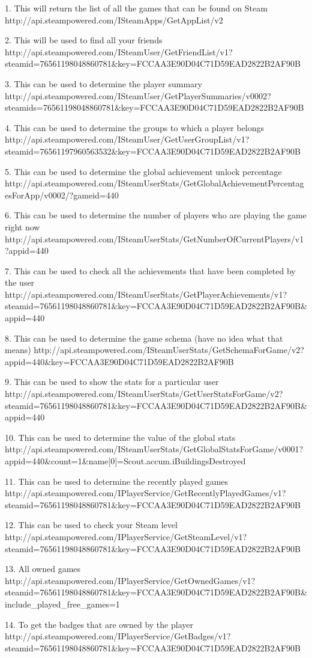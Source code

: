 1. This will return the list of all the games that can be found on Steam
http://api.steampowered.com/ISteamApps/GetAppList/v2

2. This will be used to find all your friends
http://api.steampowered.com/ISteamUser/GetFriendList/v1?steamid=76561198048860781&key=FCCAA3E90D04C71D59EAD2822B2AF90B

3. This can be used to determine the player summary
http://api.steampowered.com/ISteamUser/GetPlayerSummaries/v0002?steamids=76561198048860781&key=FCCAA3E90D04C71D59EAD2822B2AF90B

4. This can be used to determine the groups to which a player belongs
http://api.steampowered.com/ISteamUser/GetUserGroupList/v1?steamid=76561197960563532&key=FCCAA3E90D04C71D59EAD2822B2AF90B

5. This can be used to determine the global achievement unlock percentage
http://api.steampowered.com/ISteamUserStats/GetGlobalAchievementPercentagesForApp/v0002/?gameid=440

6. This can be used to determine the number of players who are playing the game right now
http://api.steampowered.com/ISteamUserStats/GetNumberOfCurrentPlayers/v1?appid=440

7. This can be used to check all the achievements that have been completed by the user
http://api.steampowered.com/ISteamUserStats/GetPlayerAchievements/v1?steamid=76561198048860781&key=FCCAA3E90D04C71D59EAD2822B2AF90B&appid=440

8. This can be used to determine the game schema (have no idea what that means)
http://api.steampowered.com/ISteamUserStats/GetSchemaForGame/v2?appid=440&key=FCCAA3E90D04C71D59EAD2822B2AF90B

9. This can be used to show the stats for a particular user
http://api.steampowered.com/ISteamUserStats/GetUserStatsForGame/v2?steamid=76561198048860781&key=FCCAA3E90D04C71D59EAD2822B2AF90B&appid=440

10. This can be used to determine the value of the global stats
http://api.steampowered.com/ISteamUserStats/GetGlobalStatsForGame/v0001?appid=440&count=1&name[0]=Scout.accum.iBuildingsDestroyed

11. This can be used to determine the recently played games
http://api.steampowered.com/IPlayerService/GetRecentlyPlayedGames/v1?steamid=76561198048860781&key=FCCAA3E90D04C71D59EAD2822B2AF90B

12. This can be used to check your Steam level
http://api.steampowered.com/IPlayerService/GetSteamLevel/v1?steamid=76561198048860781&key=FCCAA3E90D04C71D59EAD2822B2AF90B

13. All owned games
http://api.steampowered.com/IPlayerService/GetOwnedGames/v1?steamid=76561198048860781&key=FCCAA3E90D04C71D59EAD2822B2AF90B&include_played_free_games=1

14. To get the badges that are owned by the player
http://api.steampowered.com/IPlayerService/GetBadges/v1?steamid=76561198048860781&key=FCCAA3E90D04C71D59EAD2822B2AF90B